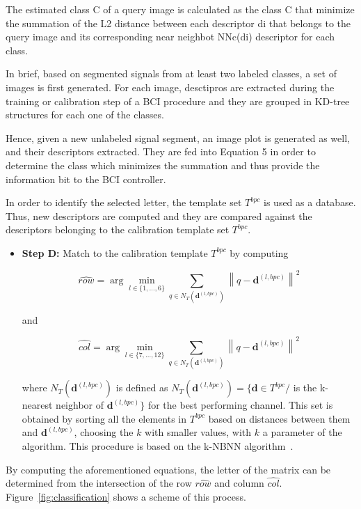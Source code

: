 The estimated class C of a query image is calculated as the class C that minimize the summation of the L2 distance between each descriptor di that belongs to the query image and its corresponding near neighbot NNc(di) descriptor for each class.

In brief, based on segmented signals from at least two labeled classes, a set of images is first generated.  For each image, desctipros are extracted during the training or calibration step of a BCI procedure and they are grouped in KD-tree~\cite{Lowe2004} structures for each one of the classes.

Hence, given a new unlabeled signal segment, an image plot is generated as well, and their descriptors extracted.  They are fed into Equation 5 in order to determine the class which minimizes the summation and thus provide the information bit to the BCI controller.  


In order to identify the selected letter, the template set $T^{bpc}$ is used as a database.  Thus, new descriptors are computed and they are compared against the descriptors belonging to the calibration template set $T^{bpc}$.

\begin{itemize}

\item \textbf{Step D:} Match to the calibration template $T^{bpc}$ by computing  

\begin{equation}
\hat{row} = \arg \min_{l \in \{1,\dots,6\}} \sum_{q \in N_T(\mathbf{d}^{(l,bpc)})}^{} {\left\lVert q -  \mathbf{d}^{(l,bpc)} \right\rVert}  ^{2}
\label{eq:multiclassificationrow}
\end{equation}

\noindent and

\begin{equation}
\hat{col} = \arg \min_{l \in \{7,\dots,12\}} \sum_{q \in N_T(\mathbf{d}^{(l,bpc)})}^{} {\left\lVert q -  \mathbf{d}^{(l,bpc)} \right\rVert} ^{2}
\label{eq:multiclassificationcol}
\end{equation}

\noindent where $N_T(\mathbf{d}^{(l,bpc)})$  is defined as $N_T(\mathbf{d}^{(l,bpc)}) = \{\mathbf{d} \in T^{bpc} / $  is the k-nearest neighbor of $ \mathbf{d}^{(l,bpc)} \}$ for the best performing channel.  This set is obtained by sorting all the elements in $T^{bpc}$ based on distances between them and $\mathbf{d}^{(l,bpc)}$, choosing the $k$ with smaller values, with $k$ a parameter of the algorithm.  This procedure is based on the k-NBNN  algorithm~\cite{Boiman2008}.

\end{itemize}
By computing the aforementioned equations, the letter of the matrix can be determined from the intersection of the row $ \hat{row} $ and column $ \hat{col} $. 
Figure~\ref{fig:classification} shows a scheme of this process. 

